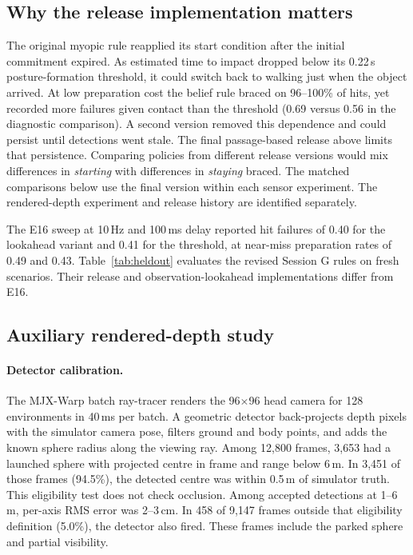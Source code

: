 \documentclass[10pt,twocolumn]{article}
\begin{document}
\subsection{Why the release implementation matters}
The original myopic rule reapplied its start condition after the initial commitment expired. As estimated time to impact dropped below its 0.22\,s posture-formation threshold, it could switch back to walking just when the object arrived. At low preparation cost the belief rule braced on 96--100\% of hits, yet recorded more failures given contact than the threshold (0.69 versus 0.56 in the diagnostic comparison). A second version removed this dependence and could persist until detections went stale. The final passage-based release above limits that persistence. Comparing policies from different release versions would mix differences in \emph{starting} with differences in \emph{staying} braced. The matched comparisons below use the final version within each sensor experiment. The rendered-depth experiment and release history are identified separately.


The E16 sweep at 10\,Hz and 100\,ms delay reported hit failures of 0.40 for the lookahead variant and 0.41 for the threshold, at near-miss preparation rates of 0.49 and 0.43. Table~\ref{tab:heldout} evaluates the revised Session G rules on fresh scenarios. Their release and observation-lookahead implementations differ from E16.


\subsection{Auxiliary rendered-depth study}\label{sec:e8}\paragraph{Detector calibration.}
The MJX-Warp batch ray-tracer renders the 96$\times$96 head camera for 128 environments in 40\,ms per batch. A geometric detector back-projects depth pixels with the simulator camera pose, filters ground and body points, and adds the known sphere radius along the viewing ray. Among 12,800 frames, 3,653 had a launched sphere with projected centre in frame and range below 6\,m. In 3,451 of those frames (94.5\%), the detected centre was within 0.5\,m of simulator truth. This eligibility test does not check occlusion. Among accepted detections at 1--6\,m, per-axis RMS error was 2--3\,cm. In 458 of 9,147 frames outside that eligibility definition (5.0\%), the detector also fired. These frames include the parked sphere and partial visibility.
\end{document}
